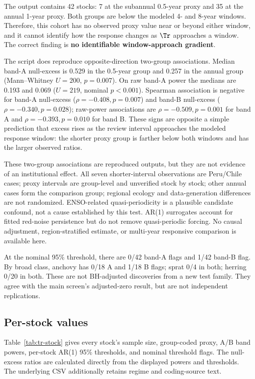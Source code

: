 The output contains 42 stocks: 7 at the subannual 0.5-year proxy and 35 at the annual 1-year proxy. Both groups are below the modeled 4- and 8-year windows. Therefore, this cohort has no observed proxy value near or beyond either window, and it cannot identify how the response changes as \(\Tr\) approaches a window. The correct finding is \textbf{no identifiable window-approach gradient}.

The script does reproduce opposite-direction two-group associations. Median band-A null-excess is 0.529 in the 0.5-year group and 0.257 in the annual group (Mann--Whitney \(U=200\), \(p=0.007\)). On raw band-A power the medians are 0.193 and 0.069 (\(U=219\), nominal \(p<0.001\)). Spearman association is negative for band-A null-excess (\(\rho=-0.408, p=0.007\)) and band-B null-excess (\(\rho=-0.340, p=0.028\)); raw-power associations are \(\rho=-0.509, p=0.001\) for band A and \(\rho=-0.393, p=0.010\) for band B. These signs are opposite a simple prediction that excess rises as the review interval approaches the modeled response window: the shorter proxy group is farther below both windows and has the larger observed ratios.

These two-group associations are reproduced outputs, but they are not evidence of an institutional effect. All seven shorter-interval observations are Peru/Chile cases; proxy intervals are group-level and unverified stock by stock; other annual cases form the comparison group; regional ecology and data-generation differences are not randomized. ENSO-related quasi-periodicity is a plausible candidate confound, not a cause established by this test. AR(1) surrogates account for fitted red-noise persistence but do not remove quasi-periodic forcing. No causal adjustment, region-stratified estimate, or multi-year responsive comparison is available here.

At the nominal 95\% threshold, there are 0/42 band-A flags and 1/42 band-B flag. By broad class, anchovy has 0/18 A and 1/18 B flags; sprat 0/4 in both; herring 0/20 in both. These are not BH-adjusted discoveries from a new test family. They agree with the main screen's adjusted-zero result, but are not independent replications.

\subsection{Per-stock values}

Table~\ref{tab:tr-stock} gives every stock's sample size, group-coded proxy, A/B band powers, per-stock AR(1) 95\% thresholds, and nominal threshold flags. The null-excess ratios are calculated directly from the displayed powers and thresholds. The underlying CSV additionally retains regime and coding-source text.

